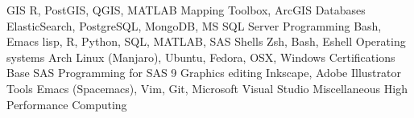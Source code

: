 \begin{cvtechskills}
    \cvtechskill    
        {GIS}
        {R, PostGIS, QGIS, MATLAB Mapping Toolbox, ArcGIS}
        {}
        {}
    \cvtechskill    
        {Databases}
        {ElasticSearch, PostgreSQL, MongoDB, MS SQL Server}
        {}
        {}
    \cvtechskill    
        {Programming}
        {Bash, Emacs lisp, R, Python, SQL, MATLAB, SAS}
        {}
        {}
    \cvtechskill    
        {Shells}
        {Zsh, Bash, Eshell}
        {}
        {}
    \cvtechskill    
        {Operating systems}
        {Arch Linux (Manjaro), Ubuntu, Fedora, OSX, Windows}
        {}
        {}  
    \cvtechskill
        {Certifications}
        {Base SAS Programming for SAS 9}
        {}
        {}
    \cvtechskill
        {Graphics editing}
        {Inkscape, Adobe Illustrator}
        {}
        {}
    \cvtechskill
        {Tools}
        {Emacs (Spacemacs), Vim, Git, Microsoft Visual Studio}
        {}
        {}
    \cvtechskill
        {Miscellaneous}
        {High Performance Computing}
        {}
        {}
\end{cvtechskills}